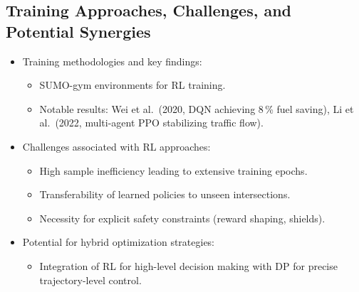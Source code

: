 \subsection{Training Approaches, Challenges, and Potential Synergies}
\label{subsec:rl_training_challenges_synergies}
\begin{itemize}
    \item Training methodologies and key findings:
    \begin{itemize}
        \item SUMO-gym environments for RL training.
        \item Notable results: Wei et al.\ (2020, DQN achieving 8\,\% fuel saving), Li et al.\ (2022, multi-agent PPO stabilizing traffic flow).
    \end{itemize}
    \item Challenges associated with RL approaches:
    \begin{itemize}
        \item High sample inefficiency leading to extensive training epochs.
        \item Transferability of learned policies to unseen intersections.
        \item Necessity for explicit safety constraints (reward shaping, shields).
    \end{itemize}
    \item Potential for hybrid optimization strategies:
    \begin{itemize}
        \item Integration of RL for high-level decision making with DP for precise trajectory-level control.
    \end{itemize}
\end{itemize}
